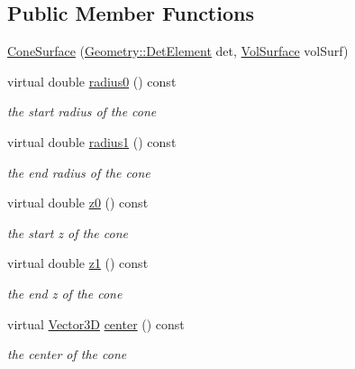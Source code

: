 \subsection*{Public Member Functions}
\begin{DoxyCompactItemize}
\item 
\hyperlink{class_d_d4hep_1_1_d_d_rec_1_1_cone_surface_ac1cbae9a5b60607333e532ffff9fb998}{ConeSurface} (\hyperlink{class_d_d4hep_1_1_geometry_1_1_det_element}{Geometry::DetElement} det, \hyperlink{class_d_d4hep_1_1_d_d_rec_1_1_vol_surface}{VolSurface} volSurf)
\item 
virtual double \hyperlink{class_d_d4hep_1_1_d_d_rec_1_1_cone_surface_afd2818bb0856bcc8bcf4dc8f13021487}{radius0} () const 
\begin{DoxyCompactList}\small\item\em the start radius of the cone \item\end{DoxyCompactList}\item 
virtual double \hyperlink{class_d_d4hep_1_1_d_d_rec_1_1_cone_surface_a06f5fb8f4f87c1adbe0c50f26c41a7ad}{radius1} () const 
\begin{DoxyCompactList}\small\item\em the end radius of the cone \item\end{DoxyCompactList}\item 
virtual double \hyperlink{class_d_d4hep_1_1_d_d_rec_1_1_cone_surface_a208dd6edd7dafbb3bbfd7208f5e54d77}{z0} () const 
\begin{DoxyCompactList}\small\item\em the start z of the cone \item\end{DoxyCompactList}\item 
virtual double \hyperlink{class_d_d4hep_1_1_d_d_rec_1_1_cone_surface_a57025cbc8425945bffdca2ded15530bf}{z1} () const 
\begin{DoxyCompactList}\small\item\em the end z of the cone \item\end{DoxyCompactList}\item 
virtual \hyperlink{class_d_d_surfaces_1_1_vector3_d}{Vector3D} \hyperlink{class_d_d4hep_1_1_d_d_rec_1_1_cone_surface_abfdad3ecbda7070c2b2b4b4d48b23ccb}{center} () const 
\begin{DoxyCompactList}\small\item\em the center of the cone \item\end{DoxyCompactList}\end{DoxyCompactItemize}


